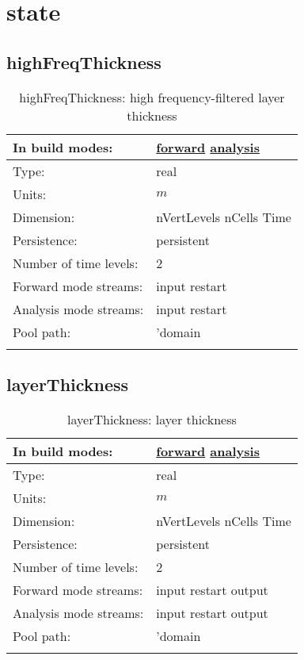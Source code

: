\section[state]{state}
\label{sec:var_sec_state}
\subsection[highFreqThickness]{highFreqThickness}
\label{subsec:var_sec_state_highFreqThickness}
\begin{center}
\begin{longtable}{| p{2.0in} | p{4.0in} |}
        \hline 
        In build modes: & \hyperref[subsec:forward_var_tab_state]{forward} \hyperref[subsec:analysis_var_tab_state]{analysis} \\
        \hline 
        Type: & real \\
        \hline 
        Units: & $m$ \\
        \hline 
        Dimension: & nVertLevels nCells Time \\
        \hline 
        Persistence: & persistent \\
        \hline 
        Number of time levels: & 2 \\
        \hline 
		 Forward mode streams: &  input restart \\
        \hline 
		 Analysis mode streams: &  input restart \\
        \hline 
            Pool path: & 'domain %
 \\
		 \hline 
    \caption{highFreqThickness: high frequency-filtered layer thickness}
\end{longtable}
\end{center}
\subsection[layerThickness]{layerThickness}
\label{subsec:var_sec_state_layerThickness}
\begin{center}
\begin{longtable}{| p{2.0in} | p{4.0in} |}
        \hline 
        In build modes: & \hyperref[subsec:forward_var_tab_state]{forward} \hyperref[subsec:analysis_var_tab_state]{analysis} \\
        \hline 
        Type: & real \\
        \hline 
        Units: & $m$ \\
        \hline 
        Dimension: & nVertLevels nCells Time \\
        \hline 
        Persistence: & persistent \\
        \hline 
        Number of time levels: & 2 \\
        \hline 
		 Forward mode streams: &  input restart output \\
        \hline 
		 Analysis mode streams: &  input restart output \\
        \hline 
            Pool path: & 'domain %
 \\
		 \hline 
    \caption{layerThickness: layer thickness}
\end{longtable}
\end{center}
